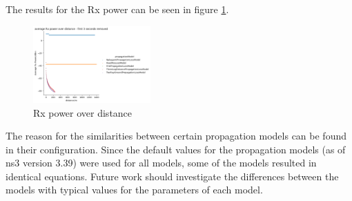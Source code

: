 The results for the Rx power can be seen in figure \ref{fig:rxPowerOverDistance}.   
\begin{figure}[ht]
    \centering
    \includegraphics[width=0.4\textwidth]{../DataAnalysis/results/rx_pwr_comp.png}
    \caption{Rx power over distance}
    \label{fig:rxPowerOverDistance}
\end{figure}

The reason for the similarities between certain propagation models can be found in their configuration.
Since the default values for the propagation models (as of ns3 version 3.39) were used for all models, 
some of the models resulted in identical equations. Future work should investigate the differences between the models
with typical values for the parameters of each model.